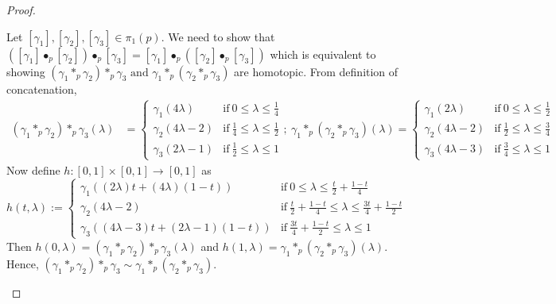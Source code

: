 \begin{proof}
\begin{enumerate}[(a)]
		      Let \([\gamma_1], [\gamma_2], [\gamma_3] \in \pi_1(p)\). We need to show that \(([\gamma_1] \bullet_p [\gamma_2]) \bullet_p [\gamma_3] = [\gamma_1] \bullet_p ([\gamma_2] \bullet_p [\gamma_3])\) which is equivalent to showing \((\gamma_1 \ast_p \gamma_2) \ast_p \gamma_3 \text{ and } \gamma_1 \ast_p (\gamma_2 \ast_p \gamma_3)\) are homotopic. From definition of concatenation,
		      \begin{align*}
			      (\gamma_1 \ast_p \gamma_2) \ast_p \gamma_3(\lambda) & = \begin{cases}
				                                                              \gamma_1(4\lambda)     & \text{if}\ 0 \le \lambda \le \frac{1}{4}           \\
				                                                              \gamma_2(4\lambda - 2) & \text{if}\ \frac{1}{4} \le \lambda \le \frac{1}{2} \\
				                                                              \gamma_3(2\lambda - 1) & \text{if}\ \frac{1}{2} \le \lambda \le 1
			                                                              \end{cases}; \
			      \gamma_1 \ast_p (\gamma_2 \ast_p \gamma_3)(\lambda) = \begin{cases}
				                                                            \gamma_1(2\lambda)     & \text{if}\ 0 \le \lambda \le \frac{1}{2}           \\
				                                                            \gamma_2(4\lambda - 2) & \text{if}\ \frac{1}{2} \le \lambda \le \frac{3}{4} \\
				                                                            \gamma_3(4\lambda - 3) & \text{if}\ \frac{3}{4} \le \lambda \le 1
			                                                            \end{cases}
		      \end{align*}
		      Now define \(h: [0, 1] \times [0, 1] \to [0, 1]\) as
		      \begin{equation*}
			      h(t, \lambda) := \begin{cases}
				      \gamma_1((2\lambda)t + (4\lambda)(1 - t))         & \text{if}\ 0 \le \lambda \le \frac{t}{2} + \frac{1-t}{4}                            \\
				      \gamma_2(4\lambda - 2)                            & \text{if}\ \frac{t}{2} + \frac{1-t}{4} \le \lambda \le \frac{3t}{4} + \frac{1-t}{2} \\
				      \gamma_3((4\lambda - 3)t + (2\lambda - 1)(1 - t)) & \text{if}\ \frac{3t}{4} + \frac{1-t}{2} \le \lambda \le 1
			      \end{cases}
		      \end{equation*}
		      Then \(h(0, \lambda) = (\gamma_1 \ast_p \gamma_2) \ast_p \gamma_3(\lambda)\) and \(h(1, \lambda) = \gamma_1 \ast_p (\gamma_2 \ast_p \gamma_3)(\lambda)\). Hence, \((\gamma_1 \ast_p \gamma_2) \ast_p \gamma_3 \sim \gamma_1 \ast_p (\gamma_2 \ast_p \gamma_3)\).


\end{enumerate}
\end{proof}
